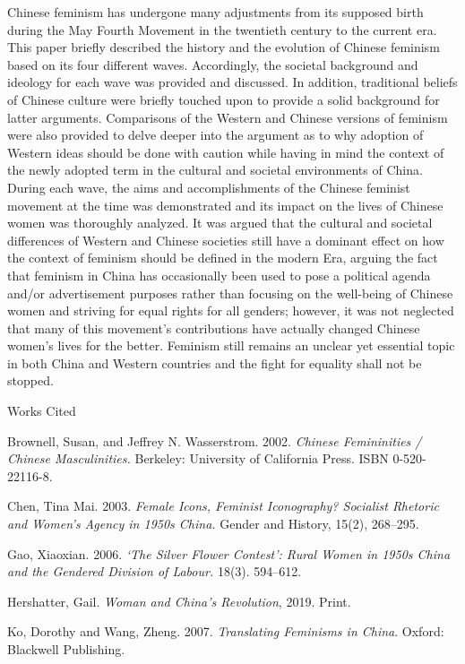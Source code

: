 \documentclass[12pt]{article}
\newcommand{\bibent}{\noindent \hangindent 40pt}
\newenvironment{workscited}{\newpage \begin{center} Works Cited \end{center}}{\newpage }
\begin{document}
\begin{flushleft}
		\noindent Chinese feminism has undergone many adjustments from its supposed birth during the May Fourth Movement in the twentieth century to the current era. This paper briefly described the history and the evolution of Chinese feminism based on its four different waves. Accordingly, the societal background and ideology for each wave was provided and discussed. In addition, traditional beliefs of Chinese culture were briefly touched upon to provide a solid background for latter arguments. Comparisons of the Western and Chinese versions of feminism were also provided to delve deeper into the argument as to why adoption of Western ideas should be done with caution while having in mind the context of the newly adopted term in the cultural and societal environments of China. During each wave, the aims and accomplishments of the Chinese feminist movement at the time was demonstrated and its impact on the lives of Chinese women was thoroughly analyzed. It was argued that the cultural and societal differences of Western and Chinese societies still have a dominant effect on how the context of feminism should be defined in the modern Era, arguing the fact that feminism in China has occasionally been used to pose a political agenda and/or advertisement purposes rather than focusing on the well-being of Chinese women and striving for equal rights for all genders; however, it was not neglected that many of this movement’s contributions have actually changed Chinese women’s lives for the better. Feminism still remains an unclear yet essential topic in both China and Western countries and the fight for equality shall not be stopped. 
		
		
		
		
		\begin{workscited}
			\bibent Brownell, Susan, and Jeffrey N. Wasserstrom. 2002. \textit{Chinese Femininities / Chinese Masculinities.} Berkeley: University of California Press. ISBN 0-520-22116-8.
			
			\bibent
			Chen, Tina Mai. 2003. \textit{Female Icons, Feminist Iconography? Socialist Rhetoric and Women’s Agency in 1950s China.} Gender and History, 15(2), 268–295.
			
			\bibent
			Gao, Xiaoxian. 2006. \textit{‘The Silver Flower Contest’: Rural Women in 1950s China 
				and the Gendered Division of Labour.} 18(3). 594–612.
			
			\bibent
			Hershatter, Gail. \textit{Woman and China's Revolution}, 2019. Print.
			
			\bibent
			Ko, Dorothy and Wang, Zheng. 2007. \textit{Translating Feminisms in China}. Oxford: Blackwell Publishing.
			

\end{workscited}
\end{flushleft}
\end{document}
